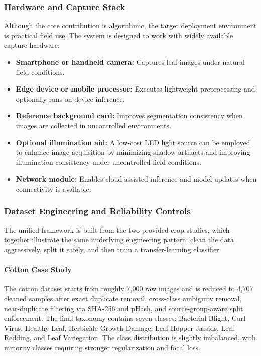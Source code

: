 \documentclass[12pt,a4paper]{report}
\begin{document}
\subsubsection{Hardware and Capture Stack}
Although the core contribution is algorithmic, the target deployment environment is practical field use. The system is designed to work with widely available capture hardware:
\begin{itemize}
\item \textbf{Smartphone or handheld camera:} Captures leaf images under natural field conditions.
\item \textbf{Edge device or mobile processor:} Executes lightweight preprocessing and optionally runs on-device inference.
\item \textbf{Reference background card:} Improves segmentation consistency when images are collected in uncontrolled environments.
\item \textbf{Optional illumination aid:} A low-cost LED light source can be employed to enhance image acquisition by minimizing shadow artifacts and improving illumination consistency under uncontrolled field conditions.
\item \textbf{Network module:} Enables cloud-assisted inference and model updates when connectivity is available.
\end{itemize}

\subsubsection{Dataset Engineering and Reliability Controls}
The unified framework is built from the two provided crop studies, which together illustrate the same underlying engineering pattern: clean the data aggressively, split it safely, and then train a transfer-learning classifier.

\paragraph{Cotton Case Study}
The cotton dataset starts from roughly 7,000 raw images and is reduced to 4,707 cleaned samples after exact duplicate removal, cross-class ambiguity removal, near-duplicate filtering via SHA-256 and pHash, and source-group-aware split enforcement. The final taxonomy contains seven classes: Bacterial Blight, Curl Virus, Healthy Leaf, Herbicide Growth Damage, Leaf Hopper Jassids, Leaf Redding, and Leaf Variegation. The class distribution is slightly imbalanced, with minority classes requiring stronger regularization and focal loss.
\end{document}
